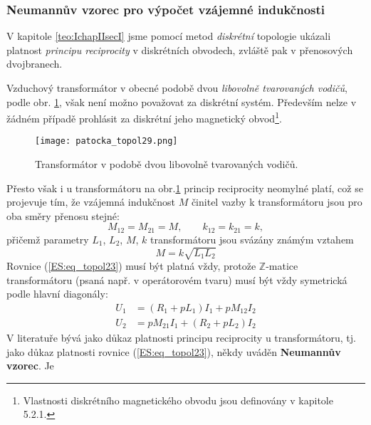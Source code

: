       \subsubsection{Neumannův vzorec pro výpočet vzájemné indukčnosti}
        V kapitole \ref{teo:IchapIIsecI} jsme pomocí metod \emph{diskrétní} topologie ukázali 
        platnost \emph{principu reciprocity} v diskrétních obvodech, zvláště pak v přenosových 
        dvojbranech.
        
        Vzduchový transformátor v obecné podobě dvou \emph{libovolně tvarovaných vodičů}, podle 
        obr. \ref{es:fig_patocka_topol29}, však není možno považovat za diskrétní systém. Především 
        nelze v žádném případě prohlásit za diskrétní jeho magnetický obvod\footnote{Vlastnosti 
        diskrétního magnetického obvodu jsou definovány v kapitole 5.2.1.}.
        \begin{figure}[ht!]
          \centering  
          \texttt{[image: patocka\_topol29.png]}
          \caption{Transformátor v podobě dvou libovolně tvarovaných vodičů.           
            \cite[s.~63]{Patocka4}} 
          \label{es:fig_patocka_topol29}
        \end{figure}        
        Přesto však i u transformátoru na obr.\ref{es:fig_patocka_topol29} princip reciprocity 
        neomylné platí, což se projevuje tím, že vzájemná indukčnost \(M\) činitel vazby k 
        transformátoru jsou pro oba směry přenosu stejné:
        \begin{equation}\label{ES:eq_topol23}
          M_{12} = M_{21} = M, \qquad k_{12} = k_{21} = k,
        \end{equation} 
        přičemž parametry \(L_1\), \(L_2\), \(M\), \(k\) transformátoru jsou svázány známým vztahem
        \begin{equation}\label{ES:eq_topol24}
          M = k\sqrt{L_1L_2}
        \end{equation} 
        Rovnice (\ref{ES:eq_topol23}) musí být platná vždy, protože \(\mathbb{Z}\)-matice 
        transformátoru (psaná např. v operátorovém tvaru) musí být vždy symetrická podle hlavní 
        diagonály:
        \begin{align}\label{ES:eq_topol25}
          U_1 &= (R_1+pL_1)I_1 + pM_{12}I_2  \nonumber \\
          U_2 &= pM_{21}I_1 + (R_2+pL_2)I_2  
        \end{align} 
        V	literatuře bývá jako důkaz platnosti principu reciprocity u transformátoru, tj. jako 
        důkaz platnosti rovnice (\ref{ES:eq_topol23}), někdy uváděn \textbf{Neumannův vzorec}. Je 
